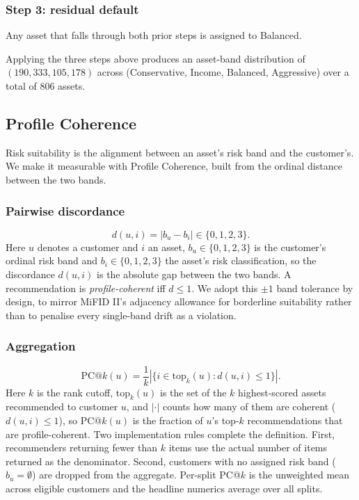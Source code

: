 \subsubsection{Step 3: residual default} Any asset that falls through both prior steps is assigned to Balanced.

Applying the three steps above produces an asset-band distribution of $(190, 333, 105, 178)$ across (Conservative, Income, Balanced, Aggressive) over a total of 806 assets.

\subsection{Profile Coherence}
\label{sec:analysis:coherence}
Risk suitability is the alignment between an asset's risk band and the customer's. We make it measurable with Profile Coherence, built from the ordinal distance between the two bands.

\subsubsection{Pairwise discordance}
\begin{equation}
d(u, i) = |b_u - b_i| \in \{0, 1, 2, 3\}.
\end{equation}
Here $u$ denotes a customer and $i$ an asset, $b_u \in \{0, 1, 2, 3\}$ is the customer's ordinal risk band and $b_i \in \{0, 1, 2, 3\}$ the asset's risk classification, so the discordance $d(u, i)$ is the absolute gap between the two bands. A recommendation is \emph{profile-coherent} iff $d \leq 1$. We adopt this $\pm 1$ band tolerance by design, to mirror MiFID II's adjacency allowance for borderline suitability rather than to penalise every single-band drift as a violation.

\subsubsection{Aggregation}
\begin{equation}
\text{PC@}k(u) = \frac{1}{k} \left|\{ i \in \text{top}_k(u) : d(u, i) \leq 1 \}\right|.
\end{equation}
Here $k$ is the rank cutoff, $\text{top}_k(u)$ is the set of the $k$ highest-scored assets recommended to customer $u$, and $|\cdot|$ counts how many of them are coherent ($d(u, i) \leq 1$), so PC@$k(u)$ is the fraction of $u$'s top-$k$ recommendations that are profile-coherent. Two implementation rules complete the definition. First, recommenders returning fewer than $k$ items use the actual number of items returned as the denominator. Second, customers with no assigned risk band ($b_u = \emptyset$) are dropped from the aggregate. Per-split PC@$k$ is the unweighted mean across eligible customers and the headline numerics average over all splits.

